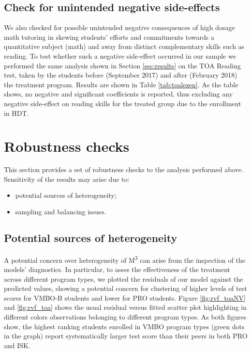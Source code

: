 \documentclass[ 12 pt]{article}
\begin{document}
\subsection{Check for unintended negative side-effects}
We also checked for possible unintended negative consequences of high dosage math tutoring in skewing students’ efforts and commitments towards a quantitative subject (math) and away from distinct complementary skills such as reading. To test whether such a negative side-effect occurred in our sample we performed the same analysis shown in Section \ref{sec:results} on the TOA Reading test, taken by the students before (September 2017) and after (February 2018) the treatment program. Results are shown in Table \ref{tab:toalezen}. As the table shows, no negative and significant coefficients is reported, thus excluding any negative side-effect on reading skills for the treated group due to the enrollment in HDT.



\section{Robustness checks}
\label{sec:robustness}
This section provides a set of robustness checks to the analysis performed above. Sensitivity of the results may arise due to:
\begin{itemize}
\item potential sources of heterogeneity;
\item sampling and balancing issues.
\end{itemize} 

\subsection{Potential sources of heterogeneity}
A potential concern over heterogeneity of M\textsuperscript{3} can arise from the inspection of the models' diagnostics. In particular, to asses the effectiveness of the treatment across different program types, we plotted the residuals of our model against the predicted values, showing a potential concern for clustering of higher levels of test scores for VMBO-B students and lower for PRO students. Figure \ref{fig:rvf_toaNV} and \ref{fig:rvf_toa} shows the usual residual versus fitted scatter plot highlighting in different colors observations belonging to different program types. As both figures show, the highest ranking students enrolled in VMBO program types (green dots in the graph) report systematically larger test score than their peers in both PRO and ISK. 
\end{document}

